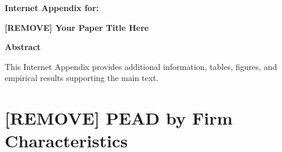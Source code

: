 \documentclass[12pt]{article}
\begin{document}





\renewcommand{\theequation}{IA.\arabic{equation}}%
\renewcommand{\thefigure}{IA.\arabic{figure}} \setcounter{figure}{0}
\renewcommand{\thetable}{IA.\Roman{table}} \setcounter{table}{0}
\renewcommand{\thesection}{IA.\arabic{section}} \setcounter{section}{0}
\setcounter{footnote}{0}

\pagebreak
\clearpage
\setcounter{page}{1}

\begin{center}
{\large \textbf{Internet Appendix for:}}

\medskip

{\LARGE \textbf{[REMOVE] Your Paper Title Here}}

\bigskip

\normalsize{\textbf{Abstract}}
\end{center}

\noindent [REMOVE] This Internet Appendix provides additional information, tables, figures, and empirical results supporting the main text.

\newpage

\singlespacing

\section{[REMOVE] PEAD by Firm Characteristics}\label{sec:IA-desc-stats}
\end{document}
